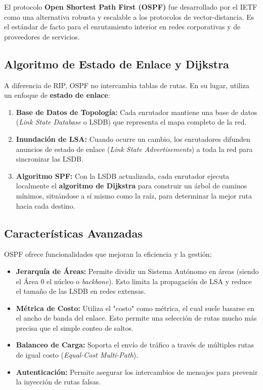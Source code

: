 El protocolo \textbf{Open Shortest Path First (OSPF)} fue desarrollado por el IETF como una alternativa robusta y escalable a los protocolos de vector-distancia. Es el estándar de facto para el enrutamiento interior en redes corporativas y de proveedores de servicios.

\subsection{Algoritmo de Estado de Enlace y Dijkstra}

A diferencia de RIP, OSPF no intercambia tablas de rutas. En su lugar, utiliza un enfoque de \textbf{estado de enlace}:

\begin{enumerate}
    \item \textbf{Base de Datos de Topología:} Cada enrutador mantiene una base de datos (\textit{Link State Database} o LSDB) que representa el mapa completo de la red.
    \item \textbf{Inundación de LSA:} Cuando ocurre un cambio, los enrutadores difunden anuncios de estado de enlace (\textit{Link State Advertisements}) a toda la red para sincronizar las LSDB.
    \item \textbf{Algoritmo SPF:} Con la LSDB actualizada, cada enrutador ejecuta localmente el \textbf{algoritmo de Dijkstra} para construir un árbol de caminos mínimos, situándose a sí mismo como la raíz, para determinar la mejor ruta hacia cada destino.
\end{enumerate}

\subsection{Características Avanzadas}

OSPF ofrece funcionalidades que mejoran la eficiencia y la gestión:

\begin{itemize}
    \item \textbf{Jerarquía de Áreas:} Permite dividir un Sistema Autónomo en áreas (siendo el Área 0 el núcleo o \textit{backbone}). Esto limita la propagación de LSA y reduce el tamaño de las LSDB en redes extensas.
    \item \textbf{Métrica de Costo:} Utiliza el "costo" como métrica, el cual suele basarse en el ancho de banda del enlace. Esto permite una selección de rutas mucho más precisa que el simple conteo de saltos.
    \item \textbf{Balanceo de Carga:} Soporta el envío de tráfico a través de múltiples rutas de igual costo (\textit{Equal-Cost Multi-Path}).
    \item \textbf{Autenticación:} Permite asegurar los intercambios de mensajes para prevenir la inyección de rutas falsas.
\end{itemize}

